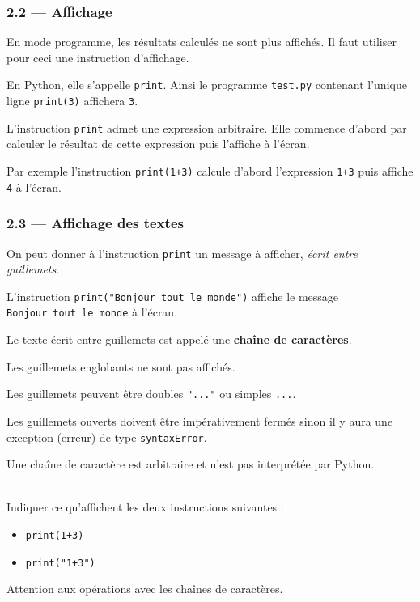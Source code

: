 \documentclass[a4paper,17pt]{extarticle}
\newenvironment{eleve}%
{\begin{activite}\color{noiramu}\\[-0.5cm]}
{\end{activite}}
\providecommand{\tightlist}{%
      \setlength{\itemsep}{0pt}\setlength{\parskip}{0pt}}
\begin{document}
    \hypertarget{affichage}{%
\subsubsection{2.2 --- Affichage}\label{affichage}}

En mode programme, les résultats calculés ne sont plus affichés. Il faut
utiliser pour ceci une instruction d'affichage.

En Python, elle s'appelle \texttt{print}. Ainsi le programme
\texttt{test.py} contenant l'unique ligne \texttt{print(3)} affichera
\texttt{3}.

    L'instruction \texttt{print} admet une expression arbitraire. Elle
commence d'abord par calculer le résultat de cette expression puis
l'affiche à l'écran.

Par exemple l'instruction \texttt{print(1+3)} calcule d'abord
l'expression \texttt{1+3} puis affiche \texttt{4} à l'écran.

    \hypertarget{affichage-des-textes}{%
\subsubsection{2.3 --- Affichage des
textes}\label{affichage-des-textes}}

On peut donner à l'instruction \texttt{print} un message à afficher,
\emph{écrit entre guillemets}.

L'instruction \texttt{print("Bonjour\ tout\ le\ monde")} affiche le
message \texttt{Bonjour\ tout\ le\ monde} à l'écran.
\begin{retenir}
    Le texte écrit entre guillemets est appelé une \textbf{chaîne de
caractères}.

        \end{retenir}\begin{remarque}
    Les guillemets englobants ne sont pas affichés.

Les guillemets peuvent être doubles \texttt{"..."} ou simples
\texttt{\textquotesingle{}...\textquotesingle{}}.

Les guillemets ouverts doivent être impérativement fermés sinon il y
aura une exception (erreur) de type \texttt{syntaxError}.

        \end{remarque}
    Une chaîne de caractère est arbitraire et n'est pas interprétée par
Python.
\begin{eleve}
    Indiquer ce qu'affichent les deux instructions suivantes :

\begin{itemize}
\tightlist
\item
  \texttt{print(1+3)}
\item
  \texttt{print("1+3")}
\end{itemize}
        
        \end{eleve}
    Attention aux opérations avec les chaînes de caractères.
\end{document}
